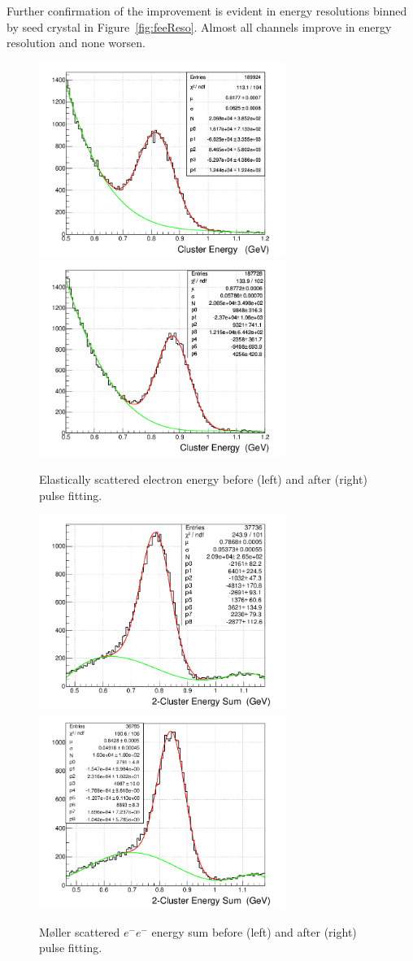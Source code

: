 \documentclass[amsmath,amssymb,notitlepage,12pt]{revtex4-1}
\begin{document}
Further confirmation of the improvement is evident in energy resolutions binned by seed crystal in Figure~\ref{fig:feeReso}.  Almost all channels improve in energy resolution and none worsen.
\begin{figure}[htbp]\centering
  \includegraphics[width=8cm]{pics/fee.png}
  \includegraphics[width=8cm]{pics/fee3pole.png}
  \caption{Elastically scattered electron energy before (left) and after (right) pulse fitting.\label{fig:fee}}
\end{figure}
\begin{figure}[htbp]\centering
  \includegraphics[width=8cm]{pics/moller.png}
  \includegraphics[width=8cm]{pics/moller3pole.png}
  \caption{M\o ller scattered $e^-e^-$ energy sum before (left) and after (right) pulse fitting.\label{fig:moller}}
\end{figure}
\end{document}
